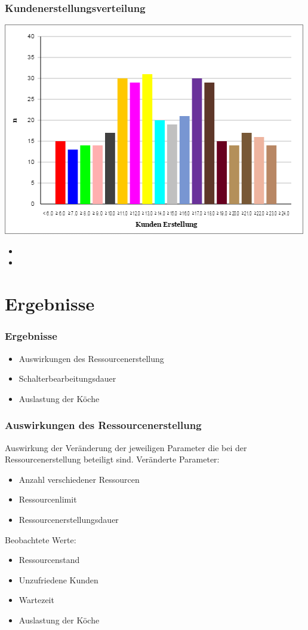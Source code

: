\documentclass{beamer}
\begin{document}
\begin{frame} %
  \frametitle{Kundenerstellungsverteilung } %
  \includegraphics[width=\textwidth, height=0.85\textheight]{./Kunden.png}
 \begin{itemize}
 \item[]
 \item[]
 \end{itemize}
\end{frame}

\section{Ergebnisse}
\begin{frame} %
  \frametitle{Ergebnisse} %
  \begin{itemize}
  	\item Auswirkungen des Ressourcenerstellung
  	\item Schalterbearbeitungsdauer
  	\item Auslastung der Köche
  \end{itemize}
\end{frame}


\begin{frame} %
  \frametitle{ Auswirkungen des Ressourcenerstellung} 
  Auswirkung der Veränderung der jeweiligen Parameter
  die bei der Ressourcenerstellung beteiligt sind.\newline
  Veränderte Parameter:
  \begin{itemize}
  	\item Anzahl verschiedener Ressourcen
  	\item Ressourcenlimit
  	\item Ressourcenerstellungsdauer
  \end{itemize}
  
  Beobachtete Werte:
  \begin{itemize}
  	\item Ressourcenstand
  	\item Unzufriedene Kunden 
  	\item Wartezeit
  	\item Auslastung der Köche
  \end{itemize}
\end{frame}  
\end{document}
